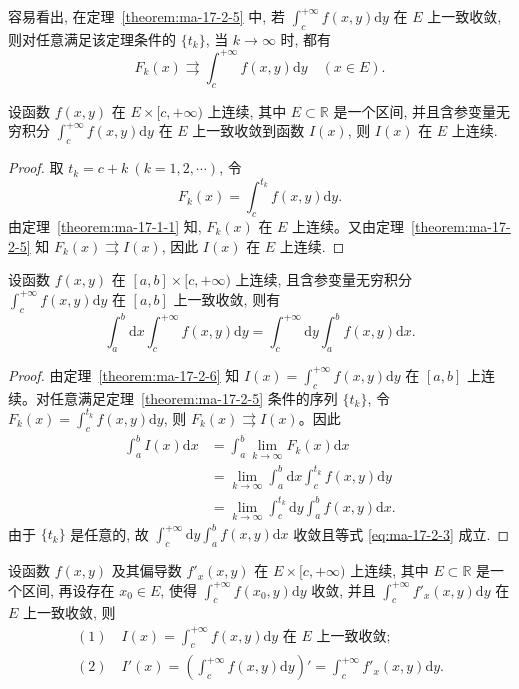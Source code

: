 容易看出, 在定理~\ref{theorem:ma-17-2-5} 中, 若 $\int_c^{+\infty}f(x,y)\mathrm dy$ 在 $E$ 上一致收敛, 则对任意满足该定理条件的 $\{t_k\}$, 当 $k\to\infty$ 时, 都有
\[
  F_k(x)\rightrightarrows \int_c^{+\infty}f(x,y)\mathrm dy\quad(x\in E).
\]

\begin{theorem}\label{theorem:ma-17-2-6}
设函数 $f(x,y)$ 在 $E\times[c,+\infty)$ 上连续, 其中 $E\subset\mathbb R$ 是一个区间, 并且含参变量无穷积分 $\int_c^{+\infty}f(x,y)\mathrm dy$ 在 $E$ 上一致收敛到函数 $I(x)$, 则 $I(x)$ 在 $E$ 上连续.
\end{theorem}


\begin{proof}
取 $t_k=c+k\ (k=1,2,\cdots)$, 令
\[
  F_k(x)=\int_c^{t_k}f(x,y)\mathrm dy.
\]
由定理~\ref{theorem:ma-17-1-1} 知, $F_k(x)$ 在 $E$ 上连续。又由定理~\ref{theorem:ma-17-2-5} 知 $F_k(x)\rightrightarrows I(x)$, 因此 $I(x)$ 在 $E$ 上连续.
\end{proof}


\begin{theorem}\label{theorem:ma-17-2-7}
设函数 $f(x,y)$ 在 $[a,b]\times[c,+\infty)$ 上连续, 且含参变量无穷积分 $\int_c^{+\infty}f(x,y)\mathrm dy$ 在 $[a,b]$ 上一致收敛, 则有
\begin{equation}
  \int_a^b\mathrm dx\int_c^{+\infty}f(x,y)\mathrm dy
  =
  \int_c^{+\infty}\mathrm dy\int_a^b f(x,y)\mathrm dx.
  \label{eq:ma-17-2-3}
\end{equation}
\end{theorem}


\begin{proof}
由定理~\ref{theorem:ma-17-2-6} 知 $I(x)=\int_c^{+\infty}f(x,y)\mathrm dy$ 在 $[a,b]$ 上连续。对任意满足定理~\ref{theorem:ma-17-2-5} 条件的序列 $\{t_k\}$, 令 $F_k(x)=\int_c^{t_k}f(x,y)\mathrm dy$, 则 $F_k(x)\rightrightarrows I(x)$。因此
\[
\begin{aligned}
  \int_a^b I(x)\mathrm dx
  &=\int_a^b\lim_{k\to\infty}F_k(x)\mathrm dx\\
  &=\lim_{k\to\infty}\int_a^b\mathrm dx\int_c^{t_k}f(x,y)\mathrm dy\\
  &=\lim_{k\to\infty}\int_c^{t_k}\mathrm dy\int_a^b f(x,y)\mathrm dx.
\end{aligned}
\]
由于 $\{t_k\}$ 是任意的, 故 $\int_c^{+\infty}\mathrm dy\int_a^b f(x,y)\mathrm dx$ 收敛且等式 \eqref{eq:ma-17-2-3} 成立.
\end{proof}


\begin{theorem}\label{theorem:ma-17-2-8}
设函数 $f(x,y)$ 及其偏导数 $f'_x(x,y)$ 在 $E\times[c,+\infty)$ 上连续, 其中 $E\subset\mathbb R$ 是一个区间, 再设存在 $x_0\in E$, 使得 $\int_c^{+\infty}f(x_0,y)\mathrm dy$ 收敛, 并且 $\int_c^{+\infty}f'_x(x,y)\mathrm dy$ 在 $E$ 上一致收敛, 则
\[
\begin{gathered}
  (1)\quad I(x)=\int_c^{+\infty}f(x,y)\mathrm dy \text{ 在 } E \text{ 上一致收敛};\\
  (2)\quad I'(x)=\left(\int_c^{+\infty}f(x,y)\mathrm dy\right)'
  =\int_c^{+\infty}f'_x(x,y)\mathrm dy.
\end{gathered}
\]
\end{theorem}


